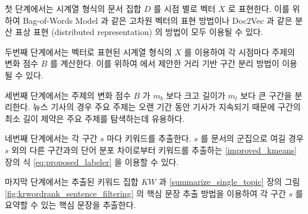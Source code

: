 \documentclass[oneside, ko,phd]{snuthesis_utf8_kor}
\begin{document}
첫 단계에서는 시계열 형식의 문서 집합 $D$ 를 시점 별로 벡터 $X$ 로 표현한다.
이를 위하여 Bag-of-Words Model 과 같은 고차원 벡터의 표현 방법이나 Doc2Vec 과 같은 분산 표상 표현 (distributed representation) 의 방법이 모두 이용될 수 있다.

두번째 단계에서는 벡터로 표현된 시계열 형식의 $X$ 를 이용하여 각 시점마다 주제의 변화 점수 $B$ 를 계산한다.
이를 위하여 \cite{kim2019representation} 에서 제안한 거리 기반 구간 분리 방법이 이용될 수 있다.

세번째 단계에서는 주제의 변화 점수 $B$ 가 $m_b$ 보다 크고 길이가 $m_l$ 보다 큰 구간을 분리한다.
뉴스 기사의 경우 주요 주제는 오랜 기간 동안 기사가 지속되기 때문에 구간의 최소 길이 제약은 주요 주제를 탐색하는데 유용하다.

네번째 단계에서는 각 구간 $s$ 마다 키워드를 추출한다.
$s$ 를 문서의 군집으로 여길 경우 $s$ 외의 다른 구간과의 단어 분포 차이로부터 키워드를 추출하는  \ref{improved_kmeans} 장의 식 \ref{eq:proposed_labeler} 을 이용할 수 있다.

마지막 단계에서는 추출된 키워드 집합 $KW$ 과 \ref{summarize_single_topic} 장의 그림 \ref{fig:krwordrank_sentence_filtering} 의 핵심 문장 추출 방법을 이용하여 각 구간 $s$ 를 요약할 수 있는 핵심 문장을 추출한다.
\end{document}
